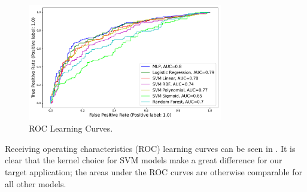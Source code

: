 \begin{figure}[ht]
\includegraphics[width=8.5cm]{plots/roccurves.pdf}
\caption{ROC Learning Curves.}
\vspace{-1em}
\label{fig:roc}
\centering
\end{figure}

Receiving operating characteristics (ROC) learning curves can be seen in . It is clear that the kernel choice for SVM models make a great difference for our target application; the areas under the ROC curves are otherwise comparable for all other models.

